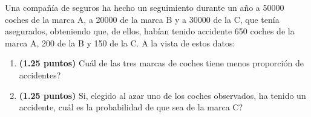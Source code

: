 
Una compañía de seguros ha hecho un seguimiento durante un año a 50000 coches de la marca A, a 20000 de la marca B y a 30000 de la C, que tenía asegurados, obteniendo que, de ellos, habían tenido accidente 650 coches de la marca A, 200 de la B y 150 de la C. A la vista de estos datos:
\begin{enumerate}[label=\alph*)]
\item \textbf{(1.25 puntos)} \textquestiondown{}Cuál de las tres marcas de coches tiene menos proporción de accidentes?
\item \textbf{(1.25 puntos)} Si, elegido al azar uno de los coches observados, ha tenido un accidente, \textquestiondown{}cuál es la probabilidad de que sea de la marca C?
\end{enumerate}
